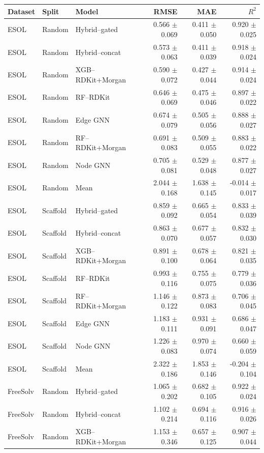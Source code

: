 \begin{tabular}{lllrrr}
\toprule
Dataset & Split & Model & RMSE & MAE & $R^2$ \\
\midrule
ESOL & Random & Hybrid--gated & 0.566 $\pm$ 0.069 & 0.411 $\pm$ 0.050 & 0.920 $\pm$ 0.025 \\
ESOL & Random & Hybrid--concat & 0.573 $\pm$ 0.063 & 0.411 $\pm$ 0.039 & 0.918 $\pm$ 0.024 \\
ESOL & Random & XGB--RDKit+Morgan & 0.590 $\pm$ 0.072 & 0.427 $\pm$ 0.044 & 0.914 $\pm$ 0.024 \\
ESOL & Random & RF--RDKit & 0.646 $\pm$ 0.069 & 0.475 $\pm$ 0.046 & 0.897 $\pm$ 0.022 \\
ESOL & Random & Edge GNN & 0.674 $\pm$ 0.079 & 0.505 $\pm$ 0.056 & 0.888 $\pm$ 0.027 \\
ESOL & Random & RF--RDKit+Morgan & 0.691 $\pm$ 0.083 & 0.509 $\pm$ 0.055 & 0.883 $\pm$ 0.022 \\
ESOL & Random & Node GNN & 0.705 $\pm$ 0.081 & 0.529 $\pm$ 0.048 & 0.877 $\pm$ 0.027 \\
ESOL & Random & Mean & 2.044 $\pm$ 0.168 & 1.638 $\pm$ 0.145 & -0.014 $\pm$ 0.017 \\
ESOL & Scaffold & Hybrid--gated & 0.859 $\pm$ 0.092 & 0.665 $\pm$ 0.054 & 0.833 $\pm$ 0.039 \\
ESOL & Scaffold & Hybrid--concat & 0.863 $\pm$ 0.070 & 0.677 $\pm$ 0.057 & 0.832 $\pm$ 0.030 \\
ESOL & Scaffold & XGB--RDKit+Morgan & 0.891 $\pm$ 0.100 & 0.678 $\pm$ 0.064 & 0.821 $\pm$ 0.035 \\
ESOL & Scaffold & RF--RDKit & 0.993 $\pm$ 0.116 & 0.755 $\pm$ 0.075 & 0.779 $\pm$ 0.036 \\
ESOL & Scaffold & RF--RDKit+Morgan & 1.146 $\pm$ 0.122 & 0.873 $\pm$ 0.083 & 0.706 $\pm$ 0.045 \\
ESOL & Scaffold & Edge GNN & 1.183 $\pm$ 0.111 & 0.931 $\pm$ 0.091 & 0.686 $\pm$ 0.047 \\
ESOL & Scaffold & Node GNN & 1.226 $\pm$ 0.083 & 0.970 $\pm$ 0.074 & 0.660 $\pm$ 0.059 \\
ESOL & Scaffold & Mean & 2.322 $\pm$ 0.186 & 1.853 $\pm$ 0.146 & -0.204 $\pm$ 0.104 \\
FreeSolv & Random & Hybrid--gated & 1.065 $\pm$ 0.202 & 0.682 $\pm$ 0.105 & 0.922 $\pm$ 0.024 \\
FreeSolv & Random & Hybrid--concat & 1.102 $\pm$ 0.214 & 0.694 $\pm$ 0.116 & 0.916 $\pm$ 0.026 \\
FreeSolv & Random & XGB--RDKit+Morgan & 1.153 $\pm$ 0.346 & 0.657 $\pm$ 0.125 & 0.907 $\pm$ 0.044 \\

\end{tabular}
